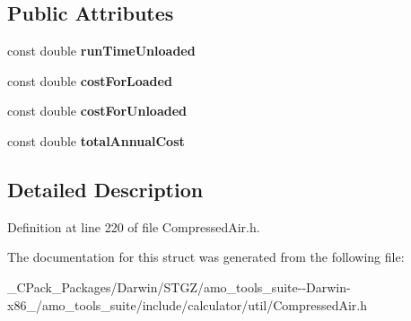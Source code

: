 \subsection*{Public Attributes}
\begin{DoxyCompactItemize}
\item 
\mbox{\label{struct_compressor_1_1_operating_cost_1_1_output_ae13051fb802def8fc6e18209db38b5aa}} 
const double {\bfseries run\+Time\+Unloaded}
\item 
\mbox{\label{struct_compressor_1_1_operating_cost_1_1_output_a4c65ee9ba069d432cf837f42a4702121}} 
const double {\bfseries cost\+For\+Loaded}
\item 
\mbox{\label{struct_compressor_1_1_operating_cost_1_1_output_a0e307a677ed5dbf7dba5b061cf5bfccf}} 
const double {\bfseries cost\+For\+Unloaded}
\item 
\mbox{\label{struct_compressor_1_1_operating_cost_1_1_output_a245a4b7baeb985a60d11b65f866563f0}} 
const double {\bfseries total\+Annual\+Cost}
\end{DoxyCompactItemize}


\subsection{Detailed Description}


Definition at line 220 of file Compressed\+Air.\+h.



The documentation for this struct was generated from the following file\+:\begin{DoxyCompactItemize}
\item 
\+\_\+\+C\+Pack\+\_\+\+Packages/\+Darwin/\+S\+T\+G\+Z/amo\+\_\+tools\+\_\+suite-\/-\/\+Darwin-\/x86\+\_/amo\+\_\+tools\+\_\+suite/include/calculator/util/Compressed\+Air.\+h\end{DoxyCompactItemize}
